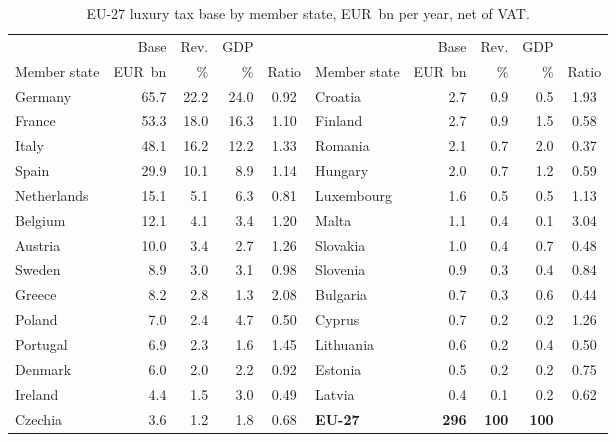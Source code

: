 \documentclass[../../main]{subfiles}
\begin{document}
\begin{table}[htbp]
\caption{EU-27 luxury tax base by member state, EUR~bn per year, net of VAT.}
\centering
\small
\begin{tabular}{@{}lrrrc@{\qquad}lrrrc@{}}
\toprule
& Base & Rev. & GDP & & & Base & Rev. & GDP & \\
Member state & EUR~bn & \% & \% & Ratio & Member state & EUR~bn & \% & \% & Ratio \\
\midrule
Germany & 65.7 & 22.2 & 24.0 & 0.92 & Croatia & 2.7 & 0.9 & 0.5 & 1.93 \\
France & 53.3 & 18.0 & 16.3 & 1.10 & Finland & 2.7 & 0.9 & 1.5 & 0.58 \\
Italy & 48.1 & 16.2 & 12.2 & 1.33 & Romania & 2.1 & 0.7 & 2.0 & 0.37 \\
Spain & 29.9 & 10.1 & 8.9 & 1.14 & Hungary & 2.0 & 0.7 & 1.2 & 0.59 \\
Netherlands & 15.1 & 5.1 & 6.3 & 0.81 & Luxembourg & 1.6 & 0.5 & 0.5 & 1.13 \\
Belgium & 12.1 & 4.1 & 3.4 & 1.20 & Malta & 1.1 & 0.4 & 0.1 & 3.04 \\
Austria & 10.0 & 3.4 & 2.7 & 1.26 & Slovakia & 1.0 & 0.4 & 0.7 & 0.48 \\
Sweden & 8.9 & 3.0 & 3.1 & 0.98 & Slovenia & 0.9 & 0.3 & 0.4 & 0.84 \\
Greece & 8.2 & 2.8 & 1.3 & 2.08 & Bulgaria & 0.7 & 0.3 & 0.6 & 0.44 \\
Poland & 7.0 & 2.4 & 4.7 & 0.50 & Cyprus & 0.7 & 0.2 & 0.2 & 1.26 \\
Portugal & 6.9 & 2.3 & 1.6 & 1.45 & Lithuania & 0.6 & 0.2 & 0.4 & 0.50 \\
Denmark & 6.0 & 2.0 & 2.2 & 0.92 & Estonia & 0.5 & 0.2 & 0.2 & 0.75 \\
Ireland & 4.4 & 1.5 & 3.0 & 0.49 & Latvia & 0.4 & 0.1 & 0.2 & 0.62 \\
Czechia & 3.6 & 1.2 & 1.8 & 0.68 & \textbf{EU-27} & \textbf{296} & \textbf{100} & \textbf{100} & \\
\bottomrule
\end{tabular}


\end{table}
\end{document}
